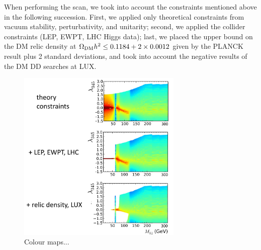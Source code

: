 \documentclass[12pt,a4paper]{article}
\newcommand {\blue} {\color{blue}}
\begin{document}
{\blue When performing the scan, we took into account the constraints mentioned above
in the following succession. First, we applied only theoretical constraints from vacuum stability, 
perturbativity, and unitarity;
second, we applied the collider constraints (LEP, EWPT, LHC Higgs data);
last, we placed the upper bound on the DM relic density at $\Omega_{\rm DM} h^2 \le 0.1184+2\times 0.0012$ 
given by the PLANCK result plus 2 standard deviations, 
and took into account the negative results of the DM DD searches at LUX.}

\begin{figure}[htb]
\begin{center}
\includegraphics[width=0.7\textwidth]{simplified.jpg}
\caption{Colour maps... \label{fig:scan-simplified}} 
\end{center}
\end{figure}
\end{document}

